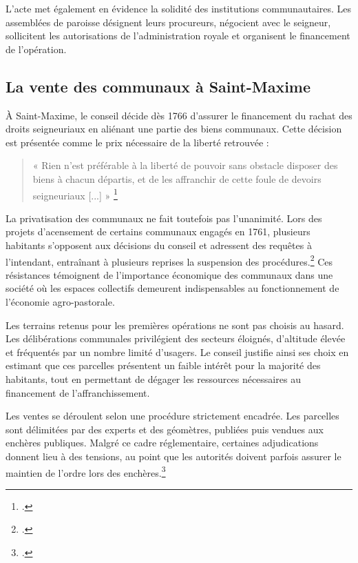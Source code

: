 \documentclass[12pt,a4paper]{report}
\begin{document}
L'acte met également en évidence la solidité des institutions communautaires. Les assemblées de paroisse désignent leurs procureurs, négocient avec le seigneur, sollicitent les autorisations de l'administration royale et organisent le financement de l'opération. 


\subsection{La vente des communaux à Saint-Maxime}

À Saint-Maxime, le conseil décide dès 1766 d'assurer le financement du rachat des droits seigneuriaux en aliénant une partie des biens communaux. Cette décision est présentée comme le prix nécessaire de la liberté retrouvée :

\begin{quote}
	« Rien n'est préférable à la liberté de pouvoir sans obstacle disposer des biens à chacun départis, et de les affranchir de cette foule de devoirs seigneuriaux [...] »
	\footcite[32]{HViallet1993}
\end{quote}

La privatisation des communaux ne fait toutefois pas l'unanimité. Lors des projets d'acensement de certains communaux engagés en 1761, plusieurs habitants s'opposent aux décisions du conseil et adressent des requêtes à l'intendant, entraînant à plusieurs reprises la suspension des procédures.\footcite[70--71]{HViallet1993} Ces résistances témoignent de l'importance économique des communaux dans une société où les espaces collectifs demeurent indispensables au fonctionnement de l'économie agro-pastorale.

Les terrains retenus pour les premières opérations ne sont pas choisis au hasard. Les délibérations communales privilégient des secteurs éloignés, d'altitude élevée et fréquentés par un nombre limité d'usagers. Le conseil justifie ainsi ses choix en estimant que ces parcelles présentent un faible intérêt pour la majorité des habitants, tout en permettant de dégager les ressources nécessaires au financement de l'affranchissement.

Les ventes se déroulent selon une procédure strictement encadrée. Les parcelles sont délimitées par des experts et des géomètres, publiées puis vendues aux enchères publiques. Malgré ce cadre réglementaire, certaines adjudications donnent lieu à des tensions, au point que les autorités doivent parfois assurer le maintien de l'ordre lors des enchères.\footcite[127]{BordeVibertGuigue1971VieRuraleBeaufort}
\end{document}
